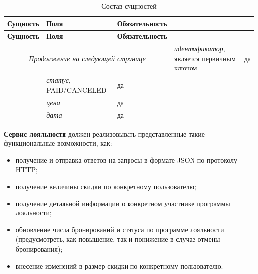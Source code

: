 \begin{longtable}{| p{3cm} | p{9.3cm} | p{3.6cm} |}
	\caption{Состав сущностей}
	\label{tbl:db_payment} \\
	\hline
	
	\textbf{Сущность} & \textbf{Поля} & \textbf{Обязательность} \\
	\hline
	\endfirsthead
	
	\hline
	\textbf{Сущность} & \textbf{Поля} & \textbf{Обязательность} \\
	\hline
	\endhead
	
	\hline
	\multicolumn{3}{c}{\textit{Продолжение на следующей странице}}
	\endfoot
	\hline
	\endlastfoot
	
	\multirow{5}{*}{Платёж}
	& 
	\textit{идентификатор}, является первичным ключом
	& 
	да \\
	\cline{2-3}

	& 
	\textit{статус}, PAID/CANCELED
	& 
	да \\
	\cline{2-3}
	
	&
	\textit{цена}
	&
	да \\
	\cline{2-3}
	
	&
	\textit{дата}
	&
	да \\
\end{longtable}

\textbf{Сервис лояльности} должен реализовывать представленные такие функциональные возможности, как:
\begin{itemize}
	\item получение и отправка ответов на запросы в формате JSON по протоколу HTTP;
	
	\item получение величины скидки по конкретному пользователю;
	
	\item получение детальной информации о конкретном участнике программы лояльности;
	
	\item обновление числа бронирований и статуса по программе лояльности (предусмотреть, как повышение, так и понижение в случае отмены бронирования);
	
	\item внесение изменений в размер скидки по конкретному пользователю.
\end{itemize}


